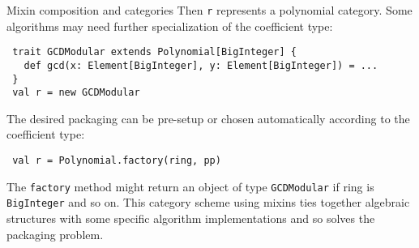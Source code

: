 \documentclass[final]{beamer}
\newcommand{\code}[1]{\texttt{#1}}
\begin{document}
\begin{frame}[fragile]
\begin{columns}[t]
\begin{column}{.3\linewidth}
\begin{block}{\large Mixin composition and categories}
{\footnotesize Then \code{r} represents a polynomial category.
Some algorithms may need further specialization of the coefficient
type:}\par
\begin{lstlisting}
 trait GCDModular extends Polynomial[BigInteger] {
   def gcd(x: Element[BigInteger], y: Element[BigInteger]) = ...
 }
 val r = new GCDModular
\end{lstlisting}
{\footnotesize The desired packaging can be pre-setup or chosen
automatically according to the coefficient type:}\par
\begin{lstlisting}
 val r = Polynomial.factory(ring, pp)
\end{lstlisting}
{\footnotesize The \code{factory} method might return an object of type
\code{GCDModular} if ring is \code{BigInteger} and so on.
This category scheme using mixins ties together algebraic structures
with some specific algorithm implementations and so solves the packaging
problem.}
  \end{block}
\end{column}

\end{columns}

\end{frame}


%
%
%
\end{document}
